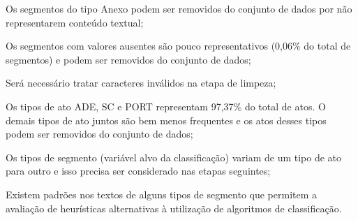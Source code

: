 \begin{alineas}
	\item Os segmentos do tipo Anexo podem ser removidos do conjunto de dados por não representarem conteúdo textual;
	\item Os segmentos com valores ausentes são pouco representativos (0,06\% do total de segmentos) e podem ser removidos do conjunto de dados;
	\item Será necessário tratar caracteres inválidos na etapa de limpeza;
	\item Os tipos de ato ADE, SC e PORT representam 97,37\% do total de atos. O demais tipos de ato juntos são bem menos frequentes e os atos desses tipos podem ser removidos do conjunto de dados;	 
	\item Os tipos de segmento (variável alvo da classificação) variam de um tipo de ato para outro e isso precisa ser considerado nas etapas seguintes;
	\item Existem padrões nos textos de alguns tipos de segmento que permitem a avaliação de heurísticas alternativas à utilização de algoritmos de classificação.
\end{alineas}
